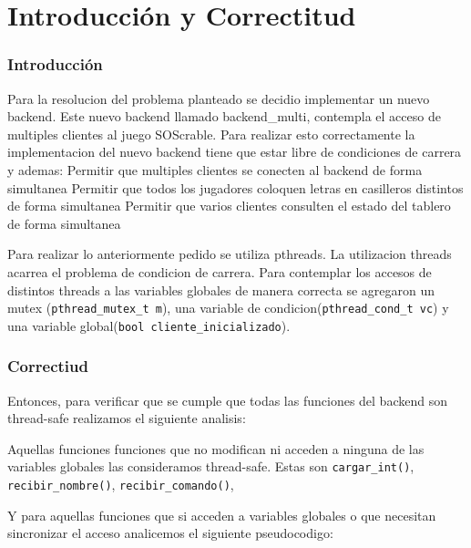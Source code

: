 \part{Introducci\'on y Correctitud}

\section{Introducci\'on}

Para la resolucion del problema planteado se decidio implementar un nuevo backend. Este nuevo backend llamado backend_multi, contempla el acceso de multiples clientes al juego SOScrable. Para realizar esto correctamente la implementacion del nuevo backend tiene que estar libre de condiciones de carrera y ademas:
Permitir que multiples clientes se conecten al backend de forma simultanea
Permitir que todos los jugadores coloquen letras en casilleros distintos de forma simultanea
Permitir que varios clientes consulten el estado del tablero de forma simultanea 

Para realizar lo anteriormente pedido se utiliza pthreads. La utilizacion threads acarrea el problema de condicion de carrera. Para contemplar los accesos de distintos threads a las variables globales de manera correcta se agregaron un mutex (\verb|pthread_mutex_t m|), una variable de condicion(\verb|pthread_cond_t vc|) y una variable global(\verb|bool cliente_inicializado|).

\section{Correctiud}

Entonces, para verificar que se cumple que todas las funciones del backend son thread-safe realizamos el siguiente analisis:

Aquellas funciones funciones que no modifican ni acceden a ninguna de las variables globales las consideramos thread-safe. Estas son \verb|cargar_int()|, \verb|recibir_nombre()|, \verb|recibir_comando()|, 

Y para aquellas funciones que si acceden a variables globales o que necesitan sincronizar el acceso analicemos el siguiente pseudocodigo:
